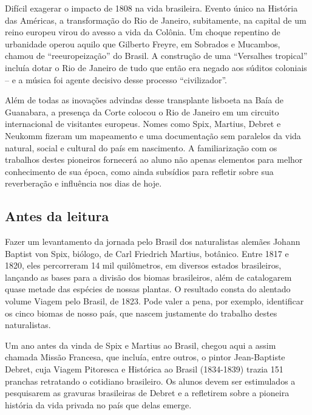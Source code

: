 \documentclass[11pt]{extarticle}
\begin{document}
Difícil exagerar o impacto de 1808 na vida brasileira. Evento único na História
das Américas, a transformação do Rio de Janeiro, subitamente, na capital de um
reino europeu virou do avesso a vida da Colônia. Um choque repentino de
urbanidade operou aquilo que Gilberto Freyre, em Sobrados e Mucambos, chamou de
“reeuropeização” do Brasil. A construção de uma “Versalhes tropical” incluía
dotar o Rio de Janeiro de tudo que então era negado aos súditos coloniais –  e
a música foi agente decisivo desse processo “civilizador”.

Além de todas as inovações advindas desse transplante lisboeta na Baía de
Guanabara, a presença da Corte colocou o Rio de Janeiro em um circuito
internacional de visitantes europeus. Nomes como Spix, Martius, Debret e
Neukomm fizeram um mapeamento e uma documentação sem paralelos da vida natural,
social e cultural do país em nascimento. A familiarização com os trabalhos
destes pioneiros fornecerá ao aluno não apenas elementos para melhor
conhecimento de sua época, como ainda subsídios para refletir sobre sua
reverberação e influência nos dias de hoje.

\subsection{Antes da leitura}

Fazer um levantamento da jornada pelo Brasil dos naturalistas alemães Johann
Baptist von Spix, biólogo, de Carl Friedrich Martius, botânico. Entre 1817 e
1820, eles percorreram 14 mil quilômetros, em diversos estados brasileiros,
lançando as bases para a divisão dos biomas brasileiros, além de catalogarem
quase metade das espécies de nossas plantas. O resultado consta do alentado
volume Viagem pelo Brasil, de 1823. Pode valer a pena, por exemplo, identificar
os cinco biomas de nosso país, que nascem justamente do trabalho destes
naturalistas.

Um ano antes da vinda de Spix e Martius ao Brasil, chegou aqui a assim chamada
Missão Francesa, que incluía, entre outros, o pintor Jean-Baptiste Debret, cuja
Viagem Pitoresca e Histórica ao Brasil (1834-1839) trazia 151 pranchas
retratando o cotidiano brasileiro. Os alunos devem ser estimulados a
pesquisarem as gravuras brasileiras de Debret e a refletirem sobre a pioneira
história da vida privada no país que delas emerge.
\end{document}
